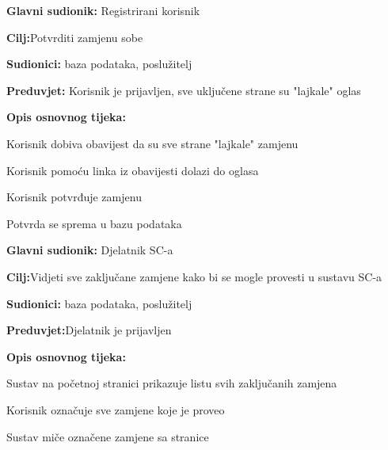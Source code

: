 \noindent {}
\begin{packed_item}
	
	\item \textbf{Glavni sudionik: }Registrirani  korisnik
	\item  \textbf{Cilj:}Potvrditi zamjenu sobe
	\item  \textbf{Sudionici:} baza podataka, poslužitelj
	\item  \textbf{Preduvjet:} Korisnik je prijavljen, sve uključene strane su "lajkale" oglas
	\item  \textbf{Opis osnovnog tijeka:}
	
	\item[] \begin{packed_enum}
		
		\item Korisnik dobiva obavijest da su sve strane "lajkale" zamjenu
		\item Korisnik pomoću linka iz obavijesti dolazi do oglasa
		\item Korisnik potvrđuje zamjenu
		\item Potvrda se sprema u bazu podataka
		
	\end{packed_enum}
\end{packed_item}
\noindent {}
\begin{packed_item}
	
	\item \textbf{Glavni sudionik: }Djelatnik SC-a
	\item  \textbf{Cilj:}Vidjeti sve zaključane zamjene kako bi se mogle provesti u sustavu SC-a
	\item  \textbf{Sudionici:} baza podataka, poslužitelj
	\item  \textbf{Preduvjet:}Djelatnik je prijavljen
	\item  \textbf{Opis osnovnog tijeka:}
	
	\item[] \begin{packed_enum}
		
		\item Sustav na početnoj stranici prikazuje listu svih zaključanih zamjena
		\item Korisnik označuje sve zamjene koje je proveo
		\item Sustav miče označene zamjene sa stranice
		
		
	\end{packed_enum}
	
\end{packed_item}	
